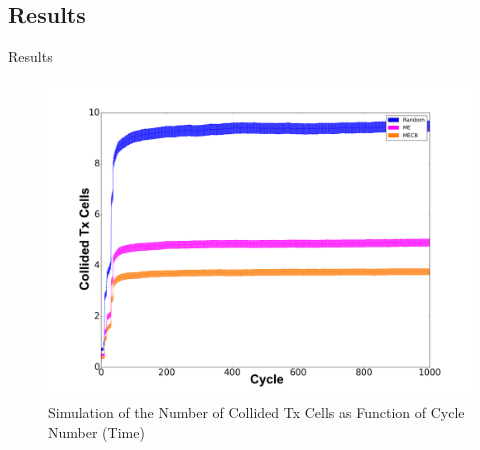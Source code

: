 \subsection{ Results}
\begin{withoutheadline}
\begin{frame}{Results}

\begin{figure}[p]

\includegraphics[width=0.8\linewidth]{figures/Graph2.png}
\caption{Simulation of the Number of Collided Tx Cells as Function of Cycle Number (Time)}
\end{figure}



\end{frame}
\end{withoutheadline}




